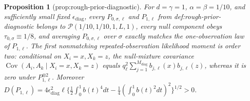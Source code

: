 \documentclass{article}
\newtheorem{proposition}{Proposition}
\begin{document}
\begin{proposition}[prop:rough-prior-diagnostic]\label{prop:rough-prior-diagnostic}
For \(d=\gamma=1\), \(\alpha=\beta=1/10\), and sufficiently small fixed \(\epsilon_{\mathrm{diag}}\), every \(P_{0,\sigma,\ell}\) and \(P_{1,\ell}\) from def:rough-prior-diagnostic belongs to \(\mathcal P(1/10,1/10,1,L,1)\), every null component obeys \(\tau_{0,\sigma}\equiv1/8\), and averaging \(P_{0,\sigma,\ell}\) over \(\sigma\) exactly matches the one-observation law of \(P_{1,\ell}\). The first nonmatching repeated-observation likelihood moment is order two: conditional on \(X_i=x,X_k=z\), the null-mixture covariance \(\operatorname{Cov}(A_i,A_k\mid X_i=x,X_k=z)\) equals \(q_{\ell}^2\sum_{j=1}^{M_{\mathrm{diag}}}b_{j,\ell}(x)b_{j,\ell}(z)\), whereas it is zero under \(P_{1,\ell}^{\otimes2}\). Moreover \(D(P_{1,\ell})=4\epsilon_{\mathrm{diag}}^2\ell\{\tfrac12\int_0^1b(t)^4dt-\tfrac14(\int_0^1b(t)^2dt)^2\}^{1/2}>0\).
\end{proposition}
\end{document}
